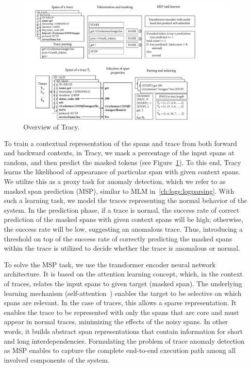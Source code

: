 \begin{figure}[!t]
\centerline{\includegraphics[width=1.0\textwidth]{gfx/chap6/overviewtracy.pdf}}
\caption{Overview of Tracy.}
\label{fig:tracyarchitecture}
\end{figure}

To train a contextual representation of the spans and trace from both forward and backward contexts, in Tracy, we mask a percentage of the input spans at random, and then predict the masked tokens (see Figure~\ref{fig:tracyarchitecture}). To this end, Tracy learns the likelihood of appearance of particular span with given context spans. We utilize this as a proxy task for anomaly detection, which we refer to as masked span prediction (MSP), similar to MLM in~\autoref{ch:logs:logparsing}. With such a learning task, we model the traces representing the normal behavior of the system. In the prediction phase, if a trace is normal, the success rate of correct prediction of the masked spans with given context spans will be high; otherwise, the success rate will be low, suggesting an anomalous trace. Thus, introducing a threshold on top of the success rate of correctly predicting the masked spans within the trace is utilized to decide whether the trace is anomalous or normal. 

To solve the MSP task, we use the transformer encoder neural network architecture. It is based on the attention learning concept, which, in the context of traces, relates the input spans to given target (masked span). The underlying learning mechanism (self-attention~\cite{vaswani2017attention}) enables the target to be selective on which spans are relevant. In the case of traces, this allows a sparse representation. It enables the trace to be represented with only the spans that are core and must appear in normal traces, minimizing the effects of the noisy spans. In other words, it builds abstract span representations that contain information for short and long interdependencies. Formulating the problem of trace anomaly detection as MSP enables to capture the complete end-to-end execution path among all involved components of the system. 


